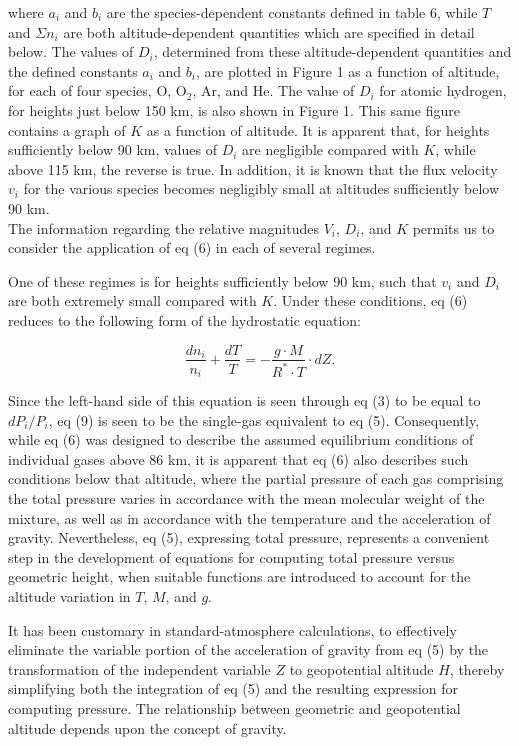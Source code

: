 \documentclass{article}
\begin{document}
where $a_i$ and $b_i$ are the species-dependent constants defined in table 6, while $T$ and $\Sigma n_i$ are both altitude-dependent quantities which are specified in detail below. The values of $D_i$, determined from these altitude-dependent quantities and the defined constants $a_i$ and $b_i$, are plotted in Figure 1 as a function of altitude, for each of four species, O, O$_2$, Ar, and He. The value of $D_i$ for atomic hydrogen, for heights just below 150 km, is also shown in Figure 1. This same figure contains a graph of $K$ as a function of altitude. It is apparent that, for heights sufficiently below 90 km, values of $D_i$ are negligible compared with $K$, while above 115 km, the reverse is true. In addition, it is known that the flux velocity $v_i$ for the various species becomes negligibly small at altitudes sufficiently below 90 km.\\

The information regarding the relative magnitudes $V_i$, $D_i$, and $K$ permits us to consider the application of eq (6) in each of several regimes.

One of these regimes is for heights sufficiently below 90 km, such that $v_i$ and $D_i$ are both extremely small compared with $K$. Under these conditions, eq (6) reduces to the following form of the hydrostatic equation:

\[
\frac{d n_i}{n_i} + \frac{dT}{T} = -\frac{g \cdot M}{R^* \cdot T} \cdot dZ. \tag{9}
\]

Since the left-hand side of this equation is seen through eq (3) to be equal to $dP_i / P_i$, eq (9) is seen to be the single-gas equivalent to eq (5). Consequently, while eq (6) was designed to describe the assumed equilibrium conditions of individual gases above 86 km, it is apparent that eq (6) also describes such conditions below that altitude, where the partial pressure of each gas comprising the total pressure varies in accordance with the mean molecular weight of the mixture, as well as in accordance with the temperature and the acceleration of gravity. Nevertheless, eq (5), expressing total pressure, represents a convenient step in the development of equations for computing total pressure versus geometric height, when suitable functions are introduced to account for the altitude variation in $T$, $M$, and $g$.

It has been customary in standard-atmosphere calculations, to effectively eliminate the variable portion of the acceleration of gravity from eq (5) by the transformation of the independent variable $Z$ to geopotential altitude $H$, thereby simplifying both the integration of eq (5) and the resulting expression for computing pressure. The relationship between geometric and geopotential altitude depends upon the concept of gravity.
\end{document}
